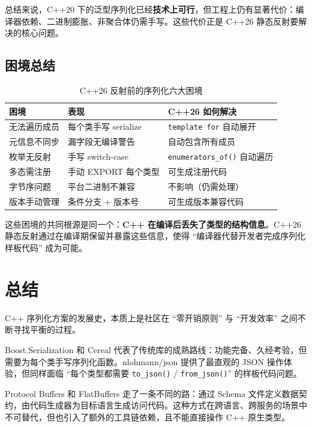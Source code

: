 \documentclass[12pt,a4paper,fontset=fandol]{ctexbook}
\newcommand{\Fn}[1]{\texttt{#1()}}
\begin{document}
总结来说，C++20 下的泛型序列化已经\textbf{技术上可行}，但工程上仍有显著代价：编译器依赖、二进制膨胀、非聚合体仍需手写。这些代价正是 C++26 静态反射要解决的核心问题。

\section{困境总结}\label{sec:dilemma-summary}

\begin{table}[H]
\centering
\caption{C++26 反射前的序列化六大困境}
\label{tab:dilemma-summary}
\small
\begin{tabular}{
  >{\raggedright\arraybackslash}p{3cm}
  >{\raggedright\arraybackslash}p{4.5cm}
  >{\raggedright\arraybackslash}p{4cm}
}
\toprule
\textbf{困境} & \textbf{表现} & \textbf{C++26 如何解决} \\
\midrule
无法遍历成员 & 每个类手写 serialize & \texttt{template for} 自动展开 \\
元信息不同步 & 漏字段无编译警告 & 自动包含所有成员 \\
枚举无反射 & 手写 switch-case & \Fn{enumerators\_of} 自动遍历 \\
多态需注册 & 手动 EXPORT 每个类型 & 可生成注册代码 \\
字节序问题 & 平台二进制不兼容 & 不影响（仍需处理） \\
版本手动管理 & 条件分支 + 版本号 & 可生成版本兼容代码 \\
\bottomrule
\end{tabular}
\end{table}

这些困境的共同根源是同一个：\textbf{C++ 在编译后丢失了类型的结构信息}。C++26 静态反射通过在编译期保留并暴露这些信息，使得 ``编译器代替开发者完成序列化样板代码'' 成为可能。

\chapter{总结}\label{ch:conclusion}

C++ 序列化方案的发展史，本质上是社区在 ``零开销原则'' 与 ``开发效率'' 之间不断寻找平衡的过程。

Boost.Serialization 和 Cereal 代表了传统库的成熟路线：功能完备、久经考验，但需要为每个类手写序列化函数。nlohmann/json 提供了最直观的 JSON 操作体验，但同样面临 ``每个类型都需要 \Fn{to\_json} / \Fn{from\_json}'' 的样板代码问题。

Protocol Buffers 和 FlatBuffers 走了一条不同的路：通过 Schema 文件定义数据契约，由代码生成器为目标语言生成访问代码。这种方式在跨语言、跨服务的场景中不可替代，但也引入了额外的工具链依赖，且不能直接操作 C++ 原生类型。
\end{document}
